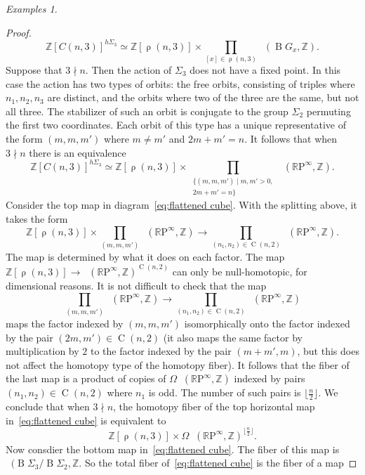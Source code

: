 \documentclass[psamsfonts]{amsart}
\theoremstyle{plain}
\theoremstyle{definition}
\theoremstyle{remark}
\newtheorem{exmps}[thm]{Examples}
\newcommand{\Z}{\mathbb{Z}}
\newcommand{\RP}{\mathbb{R}\mathrm{P}}
\newcommand{\classifying}{\operatorname{B}}
\DeclareMathOperator{\map}{Map}
\DeclareMathOperator{\pointedmaps}{\map_*}
\DeclareMathOperator{\Part}{\rho}
\DeclareMathOperator{\Comp}{C}
\begin{document}
\begin{exmps}
\begin{proof}
\[
\Z[C(n, 3)]^{h\Sigma_3} \simeq \Z[\Part(n, 3)]\times \prod_{[x]\in \Part(n, 3)}\pointedmaps (\classifying {G_x},\Z).
\]
Suppose that $3\nmid n$. Then the action of $\Sigma_3$ does not have a fixed point. In this case the action has two types of orbits: the free orbits, consisting of triples where $n_1, n_2, n_3$ are distinct, and the orbits where two of the three are the same, but not all three. The stabilizer of such an orbit is conjugate to the group $\Sigma_2$ permuting the first two coordinates. Each orbit of this type has a unique representative of the form $(m,m,m')$ where $m\ne m'$ and $2m+m'=n$. %
It follows that when $3\nmid n$ there is an equivalence
\[
\Z[C(n, 3)]^{h\Sigma_3} \simeq \Z[\Part(n, 3)]\times \prod_{\begin{array}{c}{\{(m, m, m')\mid m, m'>0,} \\ {  2m+m'=n\}}\end{array}}\pointedmaps (\RP^\infty,\Z).
\]
Consider the top map in diagram~\eqref{eq:flattened cube}. With the splitting above, it takes the form
\[
\Z[\Part(n, 3)]\times \prod_{(m, m, m')}\pointedmaps (\RP^\infty,\Z)\to \prod_{(n_1, n_2)\in \Comp(n, 2)}\pointedmaps(\RP^\infty, \Z).
\]
The map is determined by what it does on each factor. The map $\Z[\Part(n, 3)]\to \pointedmaps(\RP^\infty, \Z)^{\Comp(n, 2)}$ can only be null-homotopic, for dimensional reasons. It is not difficult to check that the map 
\[\prod_{(m, m, m')}\pointedmaps (\RP^\infty,\Z) \to \prod_{(n_1, n_2)\in \Comp(n, 2)} \pointedmaps(\RP^\infty, \Z)
\] 
maps the factor indexed by $(m,m,m')$ isomorphically onto the factor indexed by the pair $(2m, m')\in \Comp(n, 2)$ (it also maps the same factor by multiplication by $2$ to the factor indexed by the pair $(m+m', m)$, but this does not affect the homotopy type of the homotopy fiber). It follows that the fiber of the last map is a product of copies of $\Omega  \pointedmaps(\RP^\infty, \Z)$ indexed by pairs $(n_1, n_2)\in \Comp(n, 2)$ where $n_1$ is odd. The number of such pairs is $\lfloor\frac{n}{2}\rfloor$. We conclude that when $3\nmid n$, the homotopy fiber of the top horizontal map in~\eqref{eq:flattened cube} is equivalent to 
\[
\Z[\Part(n, 3)]\times \Omega \pointedmaps(\RP^\infty, \Z)^{\lfloor\frac{n}{2}\rfloor}.
\]
Now consdier the bottom map in~\eqref{eq:flattened cube}. The fiber of this map is $\pointedmaps(\classifying\Sigma_3/\classifying\Sigma_2, \Z$. So the total fiber of~\eqref{eq:flattened cube} is the fiber of a map

\end{proof}
\end{exmps}
\end{document}
